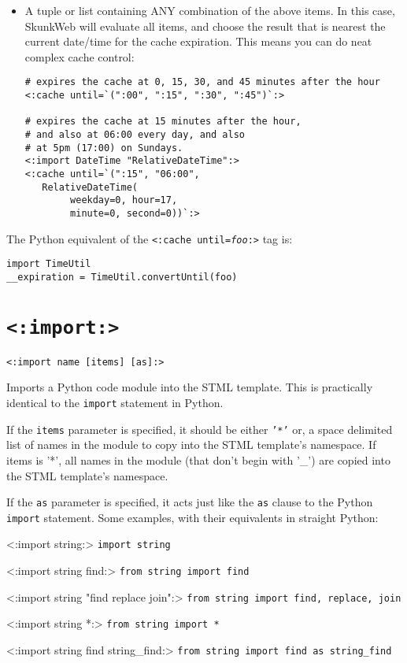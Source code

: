 \documentclass{manual}
\begin{document}
\begin{itemize}
\item A tuple or list containing ANY combination of the above
items. In this case, SkunkWeb will evaluate all items, and choose
the result that is nearest the current date/time for 
the cache expiration. This means you can do neat complex
cache control:

\begin{verbatim}# expires the cache at 0, 15, 30, and 45 minutes after the hour
<:cache until=`(":00", ":15", ":30", ":45")`:>

# expires the cache at 15 minutes after the hour,
# and also at 06:00 every day, and also
# at 5pm (17:00) on Sundays.
<:import DateTime "RelativeDateTime":>
<:cache until=`(":15", "06:00", 
   RelativeDateTime(
        weekday=0, hour=17, 
        minute=0, second=0))`:>

\end{verbatim}
\end{itemize}

The Python equivalent of the \texttt{<:cache until=\emph{foo}:>} tag is:
\begin{verbatim}
import TimeUtil
__expiration = TimeUtil.convertUntil(foo)
\end{verbatim}



\section{\texttt{<:import:>}}
\label{tagimport}

\begin{verbatim}<:import name [items] [as]:>\end{verbatim}

Imports a Python code module into the STML template. This
is practically identical to the \texttt{import}
statement in Python.

If the \texttt{items} parameter is specified, it should be 
either \texttt{'*'} or, a space delimited list of names 
in the module to copy into the STML template's namespace. 
If items is '*', all names in the module (that don't begin
with '_') are copied into the STML template's namespace.

If the \texttt{as} parameter is specified, it acts just like the
\texttt{as} clause to the Python \texttt{import} statement.
Some examples, with their equivalents in straight Python:

\begin{argdesc}

\item[<:import string:>]
\texttt{import string}
\item[<:import string find:>]   \texttt{from string import find}
\item[<:import string "find replace join":>]   \texttt{from string import find, replace, join}
\item[<:import string *:>]   \texttt{from string import *}
\item[<:import string find string_find:>] \texttt{from string import find as string_find}
\end{argdesc}
\end{document}

